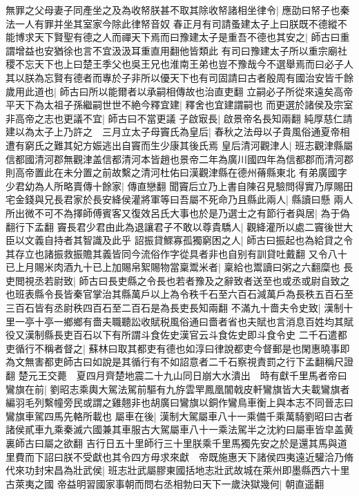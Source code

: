 無罪之父母妻子同產坐之及為收帑朕甚不取其除收帑諸相坐律令|{
	應劭曰帑子也秦法一人有罪并坐其室家今除此律帑音奴}
春正月有司請蚤建太子上曰朕既不德縱不能博求天下賢聖有德之人而禪天下焉而曰豫建太子是重吾不德也其安之|{
	師古曰重謂增益也安猶徐也言不宜汲汲耳重直用翻他皆類此}
有司曰豫建太子所以重宗廟社稷不忘天下也上曰楚王季父也吳王兄也淮南王弟也豈不豫哉今不選舉焉而曰必子人其以朕為忘賢有德者而專於子非所以優天下也有司固請曰古者殷周有國治安皆千餘歲用此道也|{
	師古曰所以能爾者以承嗣相傳故也治直吏翻}
立嗣必子所從來遠矣高帝平天下為太祖子孫繼嗣世世不絶今釋宜建|{
	釋舍也宜建謂嗣也}
而更選於諸侯及宗室非高帝之志也更議不宜|{
	師古曰不當更議}
子啟㝡長|{
	啟景帝名長知兩翻}
純厚慈仁請建以為太子上乃許之　三月立太子母竇氏為皇后|{
	春秋之法母以子貴風俗通夏帝相遭有窮氏之難其妃方娠逃出自竇而生少康其後氏焉}
皇后清河觀津人|{
	班志觀津縣屬信都國清河郡無觀津盖信都清河本皆趙也景帝二年為廣川國四年為信都郡而清河郡則高帝置此在未分置之前故繫之清河杜佑曰漢觀津縣在德州蓨縣東北}
有弟廣國字少君幼為人所略賣傳十餘家|{
	傳直戀翻}
聞竇后立乃上書自陳召見驗問得實乃厚賜田宅金錢與兄長君家於長安絳侯灌將軍等曰吾屬不死命乃且縣此兩人|{
	縣讀曰懸}
兩人所出微不可不為擇師傅賓客又復效呂氏大事也於是乃選士之有節行者與居|{
	為于偽翻行下孟翻}
竇長君少君由此為退讓君子不敢以尊貴驕人|{
	觀絳灌所以處二竇後世大臣以文義自持者其智識及此乎}
詔振貸鰥寡孤獨窮困之人|{
	師古曰振起也為給貸之令其存立也諸振救振贍其義皆同今流俗作字從具者非也自别有訓貸吐戴翻}
又令八十已上月賜米肉酒九十已上加賜帛絮賜物當稟鬻米者|{
	稟給也鬻讀曰粥之六翻糜也}
長吏閲視丞若尉致|{
	師古曰長吏縣之令長也若者豫及之辭致者送至也或丞或尉自致之也班表縣令長皆秦官掌治其縣萬戶以上為令秩千石至六百石減萬戶為長秩五百石至三百石皆有丞尉秩四百石至二百石是為長吏長知兩翻}
不滿九十嗇夫令史致|{
	漢制十里一亭十亭一鄉鄉有嗇夫職聽訟收賦税風俗通曰嗇者省也夫賦也言消息百姓均其賦役又漢制縣長吏百石以下有所謂斗食佐史漢官云斗食佐史即斗食令史}
二千石遣都吏循行不稱者督之|{
	蘇林曰取其都吏有德也如淳曰律說都吏今督郵是也閑惠曉事即為文無害都吏師古曰如說是其循行有不如詔意者二千石察視責罰之行下孟翻稱尺證翻}
楚元王交薨　夏四月齊楚地震二十九山同日崩大水潰出　時有獻千里馬者帝曰鸞旗在前|{
	劉昭志乘輿大駕法駕前驅有九斿雲䍐鳳凰闟戟皮軒鸞旗皆大夫載鸞旗者編羽毛列繫幢旁民或謂之雞翹非也胡廣曰鸞旗以銅作鸞鳥車衡上與本志不同晉志曰鸞旗車駕四馬先輅所載也}
屬車在後|{
	漢制大駕屬車八十一乘備千乘萬騎劉昭曰古者諸侯貳車九乘秦滅六國兼其車服古大駕屬車八十一乘法駕半之沈約曰屬車皆皁盖黄裏師古曰屬之欲翻}
吉行日五十里師行三十里朕乘千里馬獨先安之於是還其馬與道里費而下詔曰朕不受獻也其令四方毋求來獻　帝既施惠天下諸侯四夷遠近驩洽乃脩代來功封宋昌為壯武侯|{
	班志壯武屬膠東國括地志壯武故城在萊州即墨縣西六十里古萊夷之國}
帝益明習國家事朝而問右丞相勃曰天下一歲決獄幾何|{
	朝直遥翻}
